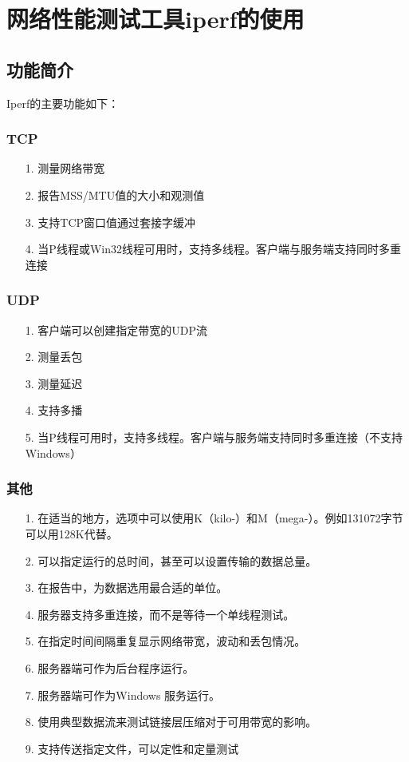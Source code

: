 \documentclass[a4paper,left=1.5cm,right=1.5cm,11pt]{article}
\begin{document}
\section{网络性能测试工具iperf的使用}
\subsection{功能简介}
Iperf的主要功能如下：
\subsubsection{TCP}
\begin{itemize}
	\item[1.]测量网络带宽
	\item[2.]报告MSS/MTU值的大小和观测值
	\item[3.]支持TCP窗口值通过套接字缓冲
	\item[4.]当P线程或Win32线程可用时，支持多线程。客户端与服务端支持同时多重连接
\end{itemize}
\subsubsection{UDP}
\begin{itemize}
	\item[1.]客户端可以创建指定带宽的UDP流
	\item[2.]测量丢包
	\item[3.]测量延迟
	\item[4.]支持多播
	\item[5.]当P线程可用时，支持多线程。客户端与服务端支持同时多重连接（不支持Windows）
\end{itemize}
\subsubsection{其他}
\begin{itemize}
	\item[1.]在适当的地方，选项中可以使用K（kilo-）和M（mega-）。例如131072字节可以用128K代替。
	\item[2.]可以指定运行的总时间，甚至可以设置传输的数据总量。
	\item[3.]在报告中，为数据选用最合适的单位。
	\item[4.]服务器支持多重连接，而不是等待一个单线程测试。
	\item[5.]在指定时间间隔重复显示网络带宽，波动和丢包情况。
	\item[6.]服务器端可作为后台程序运行。
	\item[7.]服务器端可作为Windows 服务运行。
	\item[8.]使用典型数据流来测试链接层压缩对于可用带宽的影响。
	\item[9.]支持传送指定文件，可以定性和定量测试
\end{itemize}
\end{document}
